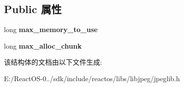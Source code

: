 \subsection*{Public 属性}
\begin{DoxyCompactItemize}
\item 
\mbox{\label{structjpeg__memory__mgr_aa7ef7c0d7ffbfcbee837ae9cb8b12c7e}} 
long {\bfseries max\+\_\+memory\+\_\+to\+\_\+use}
\item 
\mbox{\label{structjpeg__memory__mgr_a0301712c8796bb5555093d72b37c5a58}} 
long {\bfseries max\+\_\+alloc\+\_\+chunk}
\end{DoxyCompactItemize}


该结构体的文档由以下文件生成\+:\begin{DoxyCompactItemize}
\item 
E\+:/\+React\+O\+S-\/0../sdk/include/reactos/libs/libjpeg/jpeglib.\+h\end{DoxyCompactItemize}
